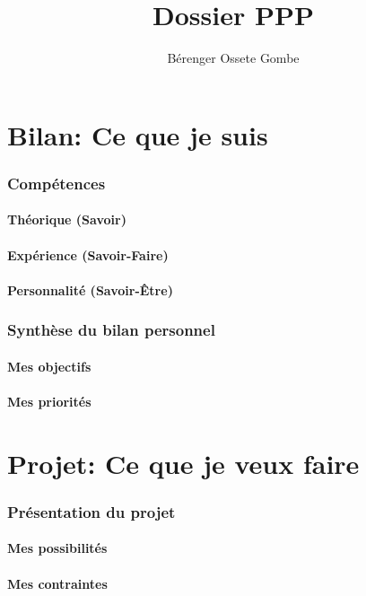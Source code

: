\documentclass[a4paper]{report}
\author{Bérenger Ossete Gombe}
\title{Dossier PPP}
\begin{document}
\maketitle

\newpage
\tableofcontents{}
\newpage

\part{Bilan: Ce que je suis}
\section{Compétences}
\subsection{Théorique (Savoir)} 
\subsection{Expérience (Savoir-Faire)}  
\subsection{Personnalité (Savoir-Être)}  
\section{Synthèse du bilan personnel} 
\subsection{Mes objectifs}
\subsection{Mes priorités}
 
\part{Projet: Ce que je veux faire}
\section{Présentation du projet} 
\subsection{Mes possibilités}
\subsection{Mes contraintes}
\end{document}
